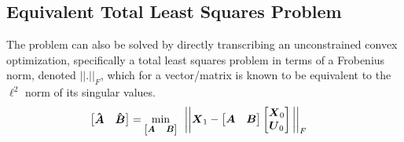 \subsection{Equivalent Total Least Squares Problem}
The problem can also be solved by directly transcribing an unconstrained convex optimization, specifically a total least squares problem in terms of a Frobenius norm, denoted $||.||_{F}$, which for a vector/matrix is known to be equivalent to the $\ell^{2}$ norm of its singular values.
\begin{equation}
\label{eq:dmdc_cost_function}
\begin{aligned}
	\vb*{\begin{bmatrix} \hat{\vb*{A}} & \hat{\vb*{B}} \end{bmatrix}} &=
		\min_{\footnotesize \begin{bmatrix} \vb*{A} & \vb*{B} \end{bmatrix}} \hspace{5pt} 
		\bigg{|}\bigg{|} \vb*{X}_{1} - \begin{bmatrix} \vb*{A} & \vb*{B} \end{bmatrix}
		\begin{bmatrix} \vb*{X}_{0} \\ \vb*{U}_{0} \end{bmatrix} \bigg{|}\bigg{|}_{F}
\end{aligned}
\end{equation}

